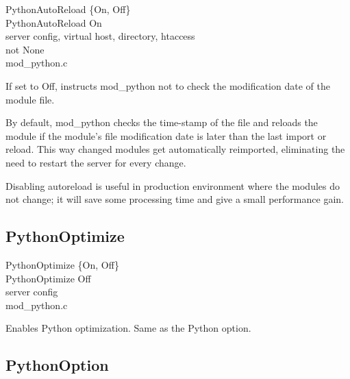 PythonAutoReload \{On, Off\} \\
PythonAutoReload On\\
server config, virtual host, directory, htaccess\\
not None\\
mod_python.c

If set to Off, instructs mod_python not to check the modification date
of the module file. 

By default, mod_python checks the time-stamp of the file and reloads
the module if the module's file modification date is later than the
last import or reload. This way changed modules get automatically
reimported, eliminating the need to restart the server for every
change.

Disabling autoreload is useful in production environment where the
modules do not change; it will save some processing time and give a
small performance gain.

\subsection{PythonOptimize\label{dir-other-pomz}}

PythonOptimize \{On, Off\} \\
PythonOptimize Off\\
server config\\
mod_python.c

Enables Python optimization. Same as the Python  option.

\subsection{PythonOption\label{dir-other-po}}

